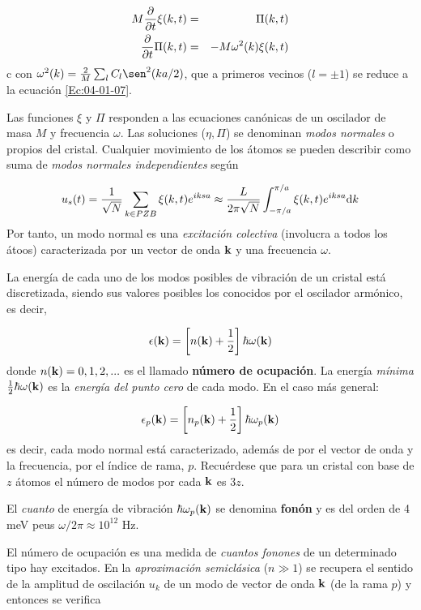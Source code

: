 \begin{eqnarray}
    M \frac{\partial }{\partial t} \xi (k,t) & = & \Pi (k,t) \\
    \frac{\partial }{\partial t} \Pi (k,t) & =  & - M \omega^2 (k) \xi (k,t)    
\end{eqnarray}c
con $\omega^2 (k) = \frac{2}{M} \sum_l C_l \sen^2 ( ka/2)$, que a primeros vecinos ($l=\pm 1$) se reduce a la ecuación \ref{Ec:04-01-07}.

Las funciones $\xi$ y $\Pi$ responden a las ecuaciones canónicas de un oscilador de masa $M$ y frecuencia $\omega$. Las soluciones ($\eta,\Pi$) se denominan \textit{modos normales} o propios del cristal. Cualquier movimiento de los átomos se pueden describir como suma de \textit{modos normales independientes} según

\begin{equation}
    u_s (t) = \frac{1}{\sqrt{N}} \sum_{k \in PZB} \xi (k,t) e^{iksa} \approx \frac{L}{2\pi \sqrt{N}} \int_{-\pi/a}^{\pi/a} \xi (k,t) e^{iksa} \mathrm{d} k
\end{equation}
Por tanto, un modo normal es una \textit{excitación colectiva} (involucra a todos los átoos) caracterizada por un vector de onda $\mathbf{k}$ y una frecuencia $\omega$. 

La energía de cada uno de los modos posibles de vibración de un cristal está discretizada, siendo sus valores posibles los conocidos por el oscilador armónico, es decir,

\begin{equation}
    \epsilon (\mathbf{k}) = \left[ n(\mathbf{k}) + \frac{1}{2} \right] \hbar \omega (\mathbf{k})
\end{equation}
donde $n(\mathbf{k})=0,1,2,...$ es el llamado \textbf{número de ocupación}. La energía \textit{mínima} $\frac{1}{2} \hbar \omega (\mathbf{k})$ es la \textit{energía del punto cero} de cada modo. En el caso más general:
 
\begin{equation}
    \epsilon_p (\mathbf{k}) = \left[ n_p(\mathbf{k}) + \frac{1}{2} \right] \hbar \omega_p ( \mathbf{k})
\end{equation}
es decir, cada modo normal está caracterizado, además de por el vector de onda y la frecuencia, por el índice de rama, $p$. Recuérdese que para un cristal con base de $z$ átomos el número de modos por cada $\mathbf{k}$ es $3z$.  

El \textit{cuanto} de energía de vibración $\hbar \omega_p (\mathbf{k})$ se denomina \textbf{fonón} y es del orden de 4 meV peus $\omega/2\pi\approx 10^{12} $ Hz.

El número de ocupación es una medida de \textit{cuantos fonones} de un determinado tipo hay excitados. En la \textit{aproximación semiclásica} ($n\gg 1$) se recupera el sentido de la amplitud de oscilación $u_k$ de un modo de vector de onda $\mathbf{k}$ (de la rama $p$) y entonces se verifica 

